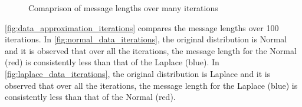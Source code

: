 \documentclass[wcp]{jmlr}
\begin{document}
\begin{figure}[!htb]
  \centering
    \hspace{0.5cm}
    \caption{Comaprison of message lengths over many iterations}
    \label{fig:data_approximation_iterations}
\end{figure}

\autoref{fig:data_approximation_iterations} compares the message lengths over 100 iterations.
In \autoref{fig:normal_data_iterations}, the original distribution is Normal and it is observed
that over all the iterations, the message length for the Normal (red) is consistently less than that
of the Laplace (blue). In \autoref{fig:laplace_data_iterations}, the original distribution is 
Laplace and it is observed that over all the iterations, the message length for the Laplace (blue) 
is consistently less than that of the Normal (red).
\end{document}
